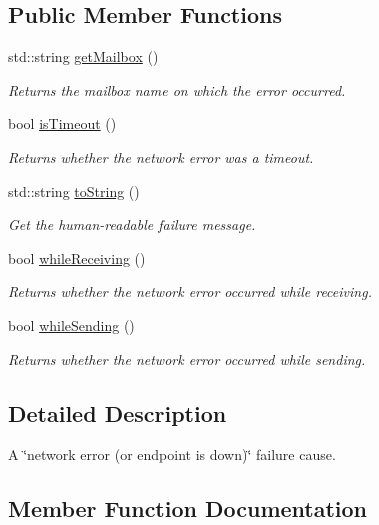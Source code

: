 \subsection*{Public Member Functions}
\begin{DoxyCompactItemize}
\item 
std\+::string \hyperlink{classwrench_1_1_network_error_a0760db02c40d2ba195aa87106951411f}{get\+Mailbox} ()
\begin{DoxyCompactList}\small\item\em Returns the mailbox name on which the error occurred. \end{DoxyCompactList}\item 
bool \hyperlink{classwrench_1_1_network_error_a4aed0a6b6496e19e70e16da31eae8b19}{is\+Timeout} ()
\begin{DoxyCompactList}\small\item\em Returns whether the network error was a timeout. \end{DoxyCompactList}\item 
std\+::string \hyperlink{classwrench_1_1_network_error_a114346c3faa84b3925600e9a22314a37}{to\+String} ()
\begin{DoxyCompactList}\small\item\em Get the human-\/readable failure message. \end{DoxyCompactList}\item 
bool \hyperlink{classwrench_1_1_network_error_a1fa6782fde91dab538f577d2608eb640}{while\+Receiving} ()
\begin{DoxyCompactList}\small\item\em Returns whether the network error occurred while receiving. \end{DoxyCompactList}\item 
bool \hyperlink{classwrench_1_1_network_error_a98a2da5f34bd18fc2c245b364e884b34}{while\+Sending} ()
\begin{DoxyCompactList}\small\item\em Returns whether the network error occurred while sending. \end{DoxyCompactList}\end{DoxyCompactItemize}


\subsection{Detailed Description}
A \char`\"{}network error (or endpoint is down)\char`\"{} failure cause. 

\subsection{Member Function Documentation}
\mbox{\label{classwrench_1_1_network_error_a0760db02c40d2ba195aa87106951411f}} 
